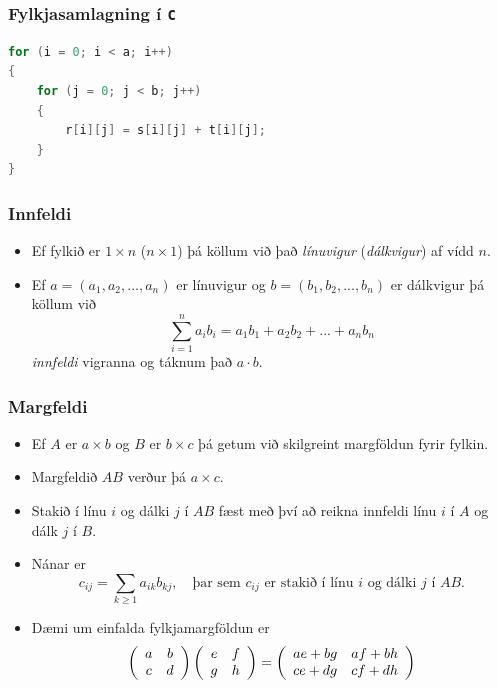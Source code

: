 \documentclass{beamer}
\begin{document}
\begin{frame}[fragile]
	\frametitle{Fylkjasamlagning í \texttt{C}}
\begin{lstlisting}[language=C]
for (i = 0; i < a; i++)
{
	for (j = 0; j < b; j++)
	{
		r[i][j] = s[i][j] + t[i][j];
	}
}
\end{lstlisting}
\end{frame}

\begin{frame}
	\frametitle{Innfeldi}
	\begin{itemize}
		\item<1-> Ef fylkið er $1 \times n$ ($n \times 1$) þá köllum við það \emph{línuvigur} (\emph{dálkvigur}) af vídd $n$.
		\item<2-> Ef $a = (a_1, a_2, ..., a_n)$ er línuvigur og $b = (b_1, b_2, ..., b_n)$ er dálkvigur þá köllum við
			\[
				\sum_{i = 1}^{n}a_ib_i = a_1b_1 + a_2b_2 + ... + a_nb_n
			\]
		\emph{innfeldi} vigranna og táknum það $a \cdot b$.
	\end{itemize}
\end{frame}

\begin{frame}
	\frametitle{Margfeldi}
	\begin{itemize}
		\item<1-> Ef $A$ er $a \times b$ og $B$ er $b \times c$ þá getum við skilgreint margföldun fyrir fylkin.
		\item<2-> Margfeldið $AB$ verður þá $a \times c$.
		\item<3-> Stakið í línu $i$ og dálki $j$ í $AB$ fæst með því að reikna innfeldi línu $i$ í $A$ og dálk $j$ í $B$.
		\item<4-> Nánar er
			\[
				c_{ij} = \sum_{k \geq 1}a_{ik}b_{kj}, \quad \text{þar sem $c_{ij}$ er stakið í línu $i$ og dálki $j$ í $AB$.}
			\]
		\item<5-> Dæmi um einfalda fylkjamargföldun er
			\[
				\left (
				\begin{array}{c c}
					a & b\\
					c & d
				\end{array}
				\right )
				\left (
				\begin{array}{c c}
					e & f\\
					g & h
				\end{array}
				\right )
				=
				\left (
				\begin{array}{c c}
					ae + bg & af + bh\\
					ce + dg & cf + dh
				\end{array}
				\right )
			\]
	\end{itemize}
\end{frame}
\end{document}

